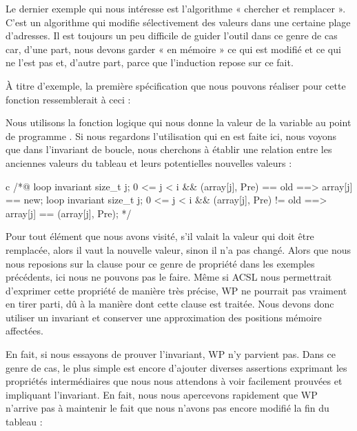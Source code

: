 \label{l4:statements-loops-ex-search-and-replace}


Le dernier exemple qui nous intéresse est l'algorithme « chercher et remplacer ». 
C'est un algorithme qui modifie sélectivement des valeurs dans une 
certaine plage d'adresses. Il est toujours un peu difficile de guider l'outil 
dans ce genre de cas car, d'une part, nous devons garder « en mémoire » ce qui est modifié 
et ce qui ne l'est pas et, d'autre part, parce que l'induction repose sur ce fait.



À titre d'exemple, la première spécification que nous pouvons réaliser pour 
cette fonction ressemblerait à ceci :






Nous utilisons la fonction logique  qui nous donne la valeur de
la variable  au point de programme . Si nous regardons l'utilisation qui
en est faite ici, nous voyons que dans l'invariant de boucle, nous cherchons à 
établir une relation entre les anciennes valeurs du tableau et leurs potentielles 
nouvelles valeurs :



\begin{CodeBlock}{c}
/*@
  loop invariant \forall size_t j; 0 <= j < i && \at(array[j], Pre) == old 
                   ==> array[j] == new;
  loop invariant \forall size_t j; 0 <= j < i && \at(array[j], Pre) != old 
                   ==> array[j] == \at(array[j], Pre);
*/
\end{CodeBlock}


Pour tout élément que nous avons visité, s'il valait la valeur qui doit être
remplacée, alors il vaut la nouvelle valeur, sinon il n'a pas changé. Alors que
nous nous reposions sur la clause  pour ce genre de propriété
dans les exemples précédents, ici nous ne pouvons pas le faire. Même si ACSL nous
permettrait d'exprimer cette propriété de manière très précise, WP ne pourrait pas
vraiment en tirer parti, dû à la manière dont cette clause est traitée. Nous devons
donc utiliser un invariant et conserver une approximation des positions mémoire
affectées.

 
En fait, si nous essayons de prouver l'invariant, WP n'y parvient pas. Dans ce genre de 
cas, le plus simple est encore d'ajouter diverses assertions exprimant les 
propriétés intermédiaires que nous nous attendons à voir facilement prouvées 
et impliquant l'invariant. En fait, nous nous apercevons rapidement que WP 
n'arrive pas à maintenir le fait que nous n'avons pas encore modifié la fin du 
tableau :




